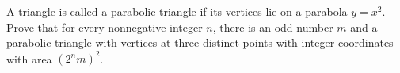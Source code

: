 A triangle is called a parabolic triangle if its vertices lie on a parabola $y = x^2$. Prove that for every nonnegative integer $n$, there is an odd number $m$ and a parabolic triangle with vertices at three distinct points with integer coordinates with area $(2^nm)^2$.